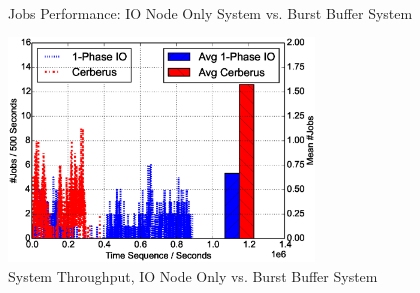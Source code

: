 \begin{figure}[!t]
        \centering
        ~
        \caption{Jobs Performance: IO Node Only System vs. Burst Buffer System}
        \label{Fig:DirectIOPerformance}
\end{figure}

\begin{figure}[!t]
        \centering
        \includegraphics[width=3.2in]{IOvsBBFigures/1000jobs_direct_vs_bb_throughput}
        \caption{System Throughput, IO Node Only vs. Burst Buffer System}
        \label{Fig:DirectIOvsBBThroughput}
\end{figure}


